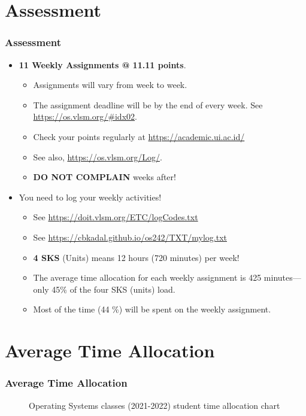 \documentclass[aspectratio=169, xcolor=table, notheorems, hyperref={pdfpagelabels=false}]{beamer}
\begin{document}
\section{Assessment}
\begin{frame}
\frametitle{Assessment}
\begin{itemize}
\item \textbf{11 Weekly Assignments @ 11.11 points}.
\begin{itemize}
\item Assignments will vary from week to week.
\item The assignment deadline will be by the end of every week. 
See \url{https://os.vlsm.org/\#idx02}.
\item Check your points regularly at \url{https://academic.ui.ac.id/}
\item See also, \url{https://os.vlsm.org/Log/}.
\item \textbf{DO NOT COMPLAIN} weeks after! 
\end{itemize}
\item You need to log your weekly activities!
\begin{itemize}
\item See \url{https://doit.vlsm.org/ETC/logCodes.txt}
\item See \url{https://cbkadal.github.io/os242/TXT/mylog.txt}
\item \textbf{4 SKS} (Units) means 12 hours (720 minutes) per week!
\item The average time allocation for each weekly assignment is 
      425 minutes—only 45\% of the four SKS (units) load.
\item Most of the time (44 \%) will be spent on the weekly assignment.
\end{itemize}
\end{itemize}

\end{frame}

\section{Average Time Allocation}
\begin{frame}
\frametitle{Average Time Allocation}

\begin{figure}
\caption{Operating Systems classes (2021-2022) student time allocation chart}
\end{figure}

\end{frame}
\end{document}
